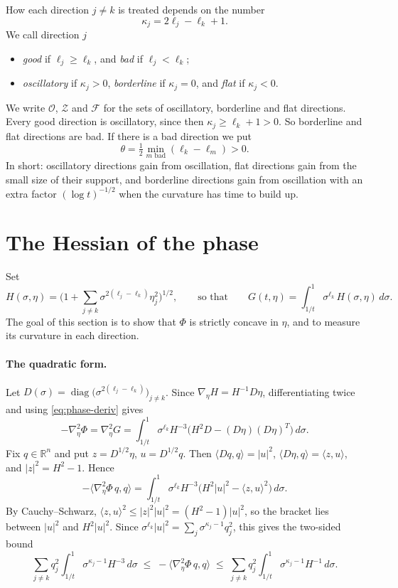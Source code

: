 \documentclass[11pt]{article}
\theoremstyle{remark}
\newcommand{\R}{\mathbb{R}}
\begin{document}
How each direction $j\ne k$ is treated depends on the number
\[
\kappa_j=2\ell_j-\ell_k+1 .
\]
We call direction $j$
\begin{itemize}
	\item \emph{good} if $\ell_j\ge\ell_k$, and \emph{bad} if $\ell_j<\ell_k$;
	\item \emph{oscillatory} if $\kappa_j>0$, \emph{borderline} if $\kappa_j=0$, and
	\emph{flat} if $\kappa_j<0$.
\end{itemize}
We write $\mathcal O$, $\mathcal Z$ and $\mathcal F$ for the sets of oscillatory,
borderline and flat directions. Every good direction is oscillatory, since then
$\kappa_j\ge\ell_k+1>0$. So borderline and flat directions are bad. If there is a bad
direction we put
\[
\theta=\tfrac12\min_{m\text{ bad}}(\ell_k-\ell_m)>0 .
\]
In short: oscillatory directions gain from oscillation, flat directions gain from
the small size of their support, and borderline directions gain from oscillation
with an extra factor $(\log t)^{-1/2}$ when the curvature has time to build up.

\section{The Hessian of the phase}\label{sec:hessian}

Set
\[
H(\sigma,\eta)=\Big(1+\sum_{j\ne k}\sigma^{2(\ell_j-\ell_k)}\eta_j^2\Big)^{1/2},
\qquad\text{so that}\qquad
G(t,\eta)=\int_{1/t}^1\sigma^{\ell_k}\,H(\sigma,\eta)\,d\sigma .
\]
The goal of this section is to show that $\Phi$ is strictly concave in $\eta$, and
to measure its curvature in each direction.

\paragraph{The quadratic form.} Let
$D(\sigma)=\operatorname{diag}\big(\sigma^{2(\ell_j-\ell_k)}\big)_{j\ne k}$. Since
$\nabla_\eta H=H^{-1}D\eta$, differentiating twice and using \eqref{eq:phase-deriv}
gives
\[
-\nabla_\eta^2\Phi=\nabla_\eta^2G
=\int_{1/t}^1\sigma^{\ell_k}H^{-3}\Big(H^2D-(D\eta)(D\eta)^{T}\Big)\,d\sigma .
\]
Fix $q\in\R^n$ and put $z=D^{1/2}\eta$, $u=D^{1/2}q$. Then
$\langle Dq,q\rangle=|u|^2$, $\langle D\eta,q\rangle=\langle z,u\rangle$, and
$|z|^2=H^2-1$. Hence
\[
-\langle\nabla_\eta^2\Phi\,q,q\rangle
=\int_{1/t}^1\sigma^{\ell_k}H^{-3}\Big(H^2|u|^2-\langle z,u\rangle^2\Big)\,d\sigma .
\]
By Cauchy--Schwarz, $\langle z,u\rangle^2\le|z|^2|u|^2=(H^2-1)|u|^2$, so the bracket
lies between $|u|^2$ and $H^2|u|^2$. Since
$\sigma^{\ell_k}|u|^2=\sum_j\sigma^{\kappa_j-1}q_j^2$, this gives the two-sided bound
\begin{equation}\label{eq:twosided}
\sum_{j\ne k}q_j^2\int_{1/t}^1\sigma^{\kappa_j-1}H^{-3}\,d\sigma
\;\le\;-\langle\nabla_\eta^2\Phi\,q,q\rangle\;\le\;
\sum_{j\ne k}q_j^2\int_{1/t}^1\sigma^{\kappa_j-1}H^{-1}\,d\sigma .
\end{equation}
\end{document}
